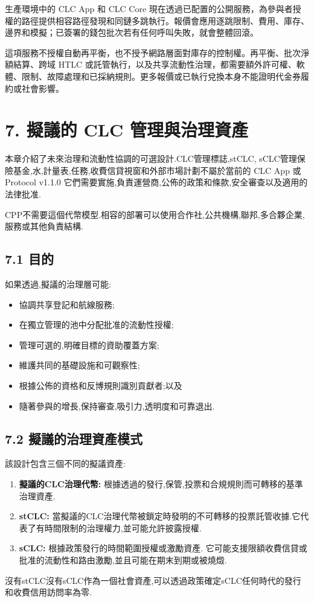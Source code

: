 \documentclass[11pt]{article}
\begin{document}
生產環境中的 CLC App 和 CLC Core 現在透過已配置的公開服務，為參與者授權的路徑提供相容路徑發現和同鏈多跳執行。報價會應用逐跳限制、費用、庫存、邊界和模擬；已簽署的錢包批次若有任何呼叫失敗，就會整體回滾。

這項服務不授權自動再平衡，也不授予網路層面對庫存的控制權。再平衡、批次淨額結算、跨域 HTLC 或託管執行，以及共享流動性治理，都需要額外許可權、軟體、限制、故障處理和已採納規則。更多報價或已執行兌換本身不能證明代金券履約或社會影響。


\section*{7. 擬議的 CLC 管理與治理資產}

本章介紹了未來治理和流動性協調的可選設計.CLC管理標誌,stCLC, sCLC管理保險基金,水,計量表,任務,收費信貸視窗和外部市場計劃不屬於當前的 CLC App 或 Protocol v1.1.0 它們需要實施,負責運營商,公佈的政策和條款,安全審查以及適用的法律批准.

CPP不需要這個代幣模型.相容的部署可以使用合作社,公共機構,聯邦,多合夥企業,服務或其他負責結構.

\subsection*{7.1 目的}

如果透過,擬議的治理層可能:

\begin{itemize}[leftmargin=*]
\item 協調共享登記和航線服務;
\item 在獨立管理的池中分配批准的流動性授權;
\item 管理可選的,明確目標的資助覆蓋方案;
\item 維護共同的基礎設施和可觀察性;
\item 根據公佈的資格和反博規則識別貢獻者;以及
\item 隨著參與的增長,保持審查,吸引力,透明度和可靠退出.
\end{itemize}
\subsection*{7.2 擬議的治理資產模式}

該設計包含三個不同的擬議資產:

\begin{enumerate}[leftmargin=*]
\item \textbf{擬議的CLC治理代幣:} 根據透過的發行,保管,投票和合規規則而可轉移的基準治理資產.
\item \textbf{stCLC:} 當擬議的CLC治理代幣被鎖定時發明的不可轉移的投票託管收據.它代表了有時間限制的治理權力,並可能允許披露授權.
\item \textbf{sCLC:} 根據政策發行的時間範圍授權或激勵資產. 它可能支援限額收費信貸或批准的流動性和路由激勵,並且可能在期末到期或被燒燬.
\end{enumerate}
沒有stCLC沒有sCLC作為一個社會資產,可以透過政策確定sCLC任何時代的發行和收費信用訪問率為零.
\end{document}
